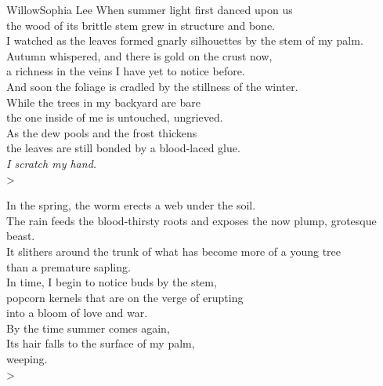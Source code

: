 \begin{poetry}{Willow}{Sophia Lee}
    When summer light first danced upon us\\
    the wood of its brittle stem grew in structure and bone.\\
    I watched as the leaves formed gnarly silhouettes by the stem of my palm.\\
    Autumn whispered, and there is gold on the crust now,\\
    a richness in the veins I have yet to notice before.\\
    And soon the foliage is cradled by the stillness of the winter.\\
    While the trees in my backyard are bare\\
    the one inside of me is untouched, ungrieved.\\
    As the dew pools and the frost thickens\\
    the leaves are still bonded by a blood-laced glue.\\
    \textit{I scratch my hand.}\\>
    
    In the spring, the worm erects a web under the soil.\\
    The rain feeds the blood-thirsty roots and exposes the now plump, grotesque beast.\\
    It slithers around the trunk of what has become more of a young tree\\
    than a premature sapling.\\
    In time, I begin to notice buds by the stem,\\
    popcorn kernels that are on the verge of erupting\\
    into a bloom of love and war.\\
    By the time summer comes again,\\
    Its hair falls to the surface of my palm,\\
    weeping.\\>
    

\end{poetry}
